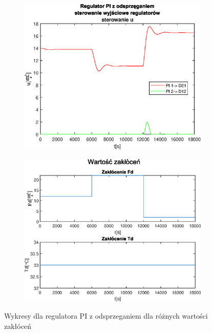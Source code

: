 \begin{figure}[h!]
   \begin{subfigure}[b]{0.4\textwidth}
      \includegraphics[width=1\linewidth]{img/PI/decoupler/disturbance/PIDecouplerControlD2DisttrueLinfalse.eps}
      \caption{}
      \label{fig:fig:PIDecoupler2DisttrueLinfalse3}
   \end{subfigure}
       
   \begin{subfigure}[b]{0.4\textwidth}
      \includegraphics[width=1\linewidth]{img/PI/decoupler/disturbance/PIDecouplerDisturbance2DisttrueLinfalse.eps}
      \caption{}
      \label{fig:fig:PIDecoupler2DisttrueLinfalse4}
   \end{subfigure}
       
   \caption{Wykresy dla regulatora PI z odsprzeganiem dla różnych wartości zakłóceń}
   \label{fig:PIDecoupler2DisttrueLinfalse}
\end{figure}
           
